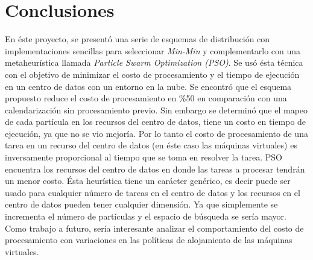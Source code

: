 \chead{}
\rhead{\thepage}

\chapter*{Conclusiones}

En éste proyecto, se presentó una serie de esquemas de distribución con implementaciones sencillas para seleccionar \textit{Min-Min} y complementarlo con una metaheurística  llamada \textit{Particle Swarm Optimization (PSO)}. Se usó ésta técnica con el objetivo de minimizar el costo de procesamiento y el tiempo de ejecución en un centro de datos con un entorno en la nube. Se encontró que el esquema propuesto reduce el costo de procesamiento en \%50 en comparación con una calendarización sin procesamiento previo. Sin embargo se determinó que el mapeo de cada partícula en los recursos del centro de datos, tiene un costo en tiempo de ejecución, ya que no se vio mejoría. Por lo tanto el costo de procesamiento de una tarea en un recurso del centro de datos (en éste caso las máquinas virtuales) es inversamente proporcional al tiempo que se toma en resolver la tarea.
PSO encuentra los recursos del centro de datos en donde las tareas a procesar tendrán un menor costo. Ésta heurística tiene un carácter genérico, es decir puede ser usado para cualquier número de tareas en el centro de datos y los recursos en el centro de datos pueden tener cualquier dimensión. Ya que simplemente se incrementa el número de partículas y el espacio de búsqueda se sería mayor.
Como trabajo a futuro, sería interesante analizar el comportamiento del costo de procesamiento con variaciones en las políticas de alojamiento de las máquinas virtuales.



